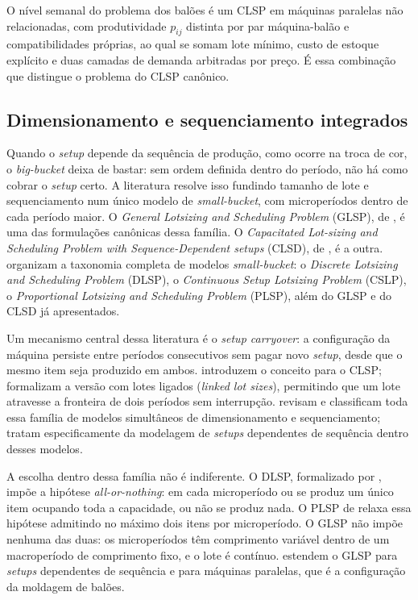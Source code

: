 \documentclass[fleqn,12pt,a4paper]{article}
\begin{document}
O nível semanal do problema dos balões é um CLSP em máquinas paralelas não relacionadas, com produtividade $p_{ij}$ distinta por par máquina-balão e compatibilidades próprias, ao qual se somam lote mínimo, custo de estoque explícito e duas camadas de demanda arbitradas por preço. É essa combinação que distingue o problema do CLSP canônico.

\subsection{Dimensionamento e sequenciamento integrados}

Quando o \textit{setup} depende da sequência de produção, como ocorre na troca de cor, o \textit{big-bucket} deixa de bastar: sem ordem definida dentro do período, não há como cobrar o \textit{setup} certo. A literatura resolve isso fundindo tamanho de lote e sequenciamento num único modelo de \textit{small-bucket}, com microperíodos dentro de cada período maior. O \textit{General Lotsizing and Scheduling Problem} (GLSP), de , é uma das formulações canônicas dessa família. O \textit{Capacitated Lot-sizing and Scheduling Problem with Sequence-Dependent setups} (CLSD), de , é a outra.  organizam a taxonomia completa de modelos \textit{small-bucket}: o \textit{Discrete Lotsizing and Scheduling Problem} (DLSP), o \textit{Continuous Setup Lotsizing Problem} (CSLP), o \textit{Proportional Lotsizing and Scheduling Problem} (PLSP), além do GLSP e do CLSD já apresentados.

Um mecanismo central dessa literatura é o \textit{setup carryover}: a configuração da máquina persiste entre períodos consecutivos sem pagar novo \textit{setup}, desde que o mesmo item seja produzido em ambos.  introduzem o conceito para o CLSP;  formalizam a versão com lotes ligados (\textit{linked lot sizes}), permitindo que um lote atravesse a fronteira de dois períodos sem interrupção.  revisam e classificam toda essa família de modelos simultâneos de dimensionamento e sequenciamento;  tratam especificamente da modelagem de \textit{setups} dependentes de sequência dentro desses modelos.

A escolha dentro dessa família não é indiferente. O DLSP, formalizado por , impõe a hipótese \textit{all-or-nothing}: em cada microperíodo ou se produz um único item ocupando toda a capacidade, ou não se produz nada. O PLSP de  relaxa essa hipótese admitindo no máximo dois itens por microperíodo. O GLSP não impõe nenhuma das duas: os microperíodos têm comprimento variável dentro de um macroperíodo de comprimento fixo, e o lote é contínuo.  estendem o GLSP para \textit{setups} dependentes de sequência e para máquinas paralelas, que é a configuração da moldagem de balões.
\end{document}
